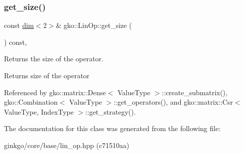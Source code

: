\subsubsection{\texorpdfstring{get\+\_\+size()}{get\_size()}}
{\footnotesize\ttfamily const \hyperlink{structgko_1_1dim}{dim}$<$2$>$\& gko\+::\+Lin\+Op\+::get\+\_\+size (\begin{DoxyParamCaption}{ }\end{DoxyParamCaption}) const\hspace{0.3cm}{\ttfamily [inline]}, {\ttfamily [noexcept]}}



Returns the size of the operator. 

\begin{DoxyReturn}{Returns}
size of the operator 
\end{DoxyReturn}


Referenced by gko\+::matrix\+::\+Dense$<$ Value\+Type $>$\+::create\+\_\+submatrix(), gko\+::\+Combination$<$ Value\+Type $>$\+::get\+\_\+operators(), and gko\+::matrix\+::\+Csr$<$ Value\+Type, Index\+Type $>$\+::get\+\_\+strategy().



The documentation for this class was generated from the following file\+:\begin{DoxyCompactItemize}
\item 
ginkgo/core/base/lin\+\_\+op.\+hpp (c71510aa)\end{DoxyCompactItemize}
